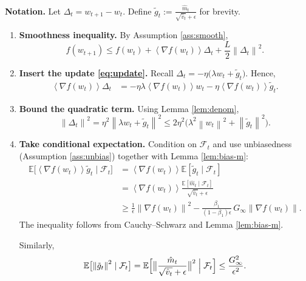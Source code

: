 \documentclass{article}
\newcommand{\E}{\mathbb{E}}
\newcommand{\norm}[1]{\left\|#1\right\|}
\newcommand{\inner}[1]{\left\langle#1\right\rangle}
\begin{document}
\noindent\textbf{Notation.} Let $\Delta_{t}=w_{t+1}-w_{t}$.  
Define $\tilde g_{t}:=\frac{\hat m_{t}}{\sqrt{\hat v_{t}}+\epsilon}$ for brevity.

\begin{enumerate}
\item[Step 1.] \textbf{Smoothness inequality.}  
By Assumption \ref{ass:smooth},
\begin{equation}
f(w_{t+1})\le f(w_{t})+\inner{\nabla f(w_{t})}{\Delta_{t}}+\frac{L}{2}\norm{\Delta_{t}}^{2}.
\label{eq:smooth}
\end{equation}
\item[Step 2.] \textbf{Insert the update \eqref{eq:update}.}  
Recall $\Delta_{t}= -\eta\bigl(\lambda w_{t}+\tilde g_{t}\bigr)$. Hence,
\begin{align}
\inner{\nabla f(w_{t})}{\Delta_{t}}
   &= -\eta\lambda\inner{\nabla f(w_{t})}{w_{t}}
      -\eta\inner{\nabla f(w_{t})}{\tilde g_{t}}.
\label{eq:inner}
\end{align}
\item[Step 3.] \textbf{Bound the quadratic term.}  
Using Lemma \ref{lem:denom},
\[
\norm{\Delta_{t}}^{2}
   =\eta^{2}\norm{\lambda w_{t}+\tilde g_{t}}^{2}
   \le 2\eta^{2}\bigl(\lambda^{2}\norm{w_{t}}^{2}+\norm{\tilde g_{t}}^{2}\bigr).
\label{eq:quad}
\]
\item[Step 4.] \textbf{Take conditional expectation.}  
Condition on $\mathcal{F}_{t}$ and use unbiasedness (Assumption \ref{ass:unbias}) together with Lemma \ref{lem:bias-m}:
\begin{align}
\E\bigl[\inner{\nabla f(w_{t})}{\tilde g_{t}}\mid\mathcal{F}_{t}\bigr]
   &= \inner{\nabla f(w_{t})}{\E[\tilde g_{t}\mid\mathcal{F}_{t}]}\nonumber\\
   &= \inner{\nabla f(w_{t})}{\frac{\E[\hat m_{t}\mid\mathcal{F}_{t}]}{\sqrt{\hat v_{t}}+\epsilon}}\nonumber\\
   &\ge \frac{1}{\epsilon}\norm{\nabla f(w_{t})}^{2}
      -\frac{\beta_{1}}{(1-\beta_{1})\epsilon}\,G_{\infty}\norm{\nabla f(w_{t})}.
\label{eq:exp-inner}
\end{align}
The inequality follows from Cauchy–Schwarz and Lemma \ref{lem:bias-m}.  

Similarly,
\[
\E\bigl[\norm{\tilde g_{t}}^{2}\mid\mathcal{F}_{t}\bigr]
  =\E\Bigl[\bigl\|\frac{\hat m_{t}}{\sqrt{\hat v_{t}}+\epsilon}\bigr\|^{2}\Bigm|\mathcal{F}_{t}\Bigr]
  \le\frac{G_{\infty}^{2}}{\epsilon^{2}}.
\label{eq:exp-quad}
\]


\end{enumerate}
\end{document}
